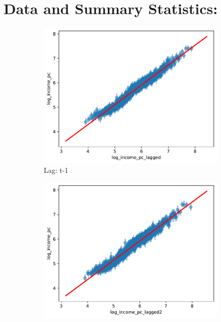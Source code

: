 \section{Data and Summary Statistics:}

\begin{figure}[H]
    \caption{Correlation of log(Income) with Lagged Conglomerate Log Income}
    \centering
         \centering
         \begin{subfigure}[b]{0.47\textwidth}
             \centering
             \includegraphics[width=\textwidth]{../figures/figA_income_vs_lagged_income_log_log_scatterplot.pdf}
             \caption{Lag: t-1}
         \end{subfigure}
         \hfill
         \begin{subfigure}[b]{0.47\textwidth}
             \centering
             \includegraphics[width=\textwidth]{../figures/figA_income_vs_lagged2_income_log_log_scatterplot.pdf}

\end{subfigure}
\end{figure}
